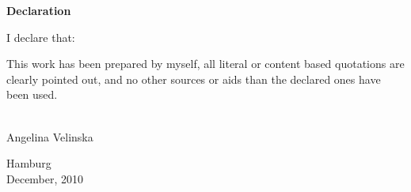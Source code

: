 \bigskip
\bigskip

\pagebreak\par
{\LARGE\noindent \textbf{Declaration}}\\

\bigskip
\bigskip

\noindent I declare that:\\

\medskip

This work has been prepared by myself, all literal or content based quotations are clearly pointed out, and no other sources or aids than the declared ones have been used.\\
\vspace{2cm}\\

\begin{flushright}
Angelina Velinska 
\end{flushright}

Hamburg \\
December, 2010 

\pagebreak 
